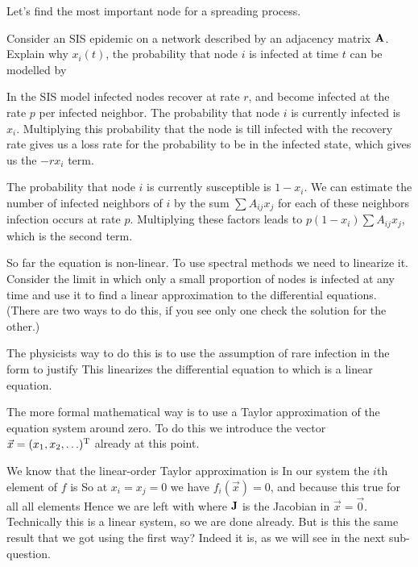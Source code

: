 

Let's find the most important node for a spreading process.

\subquestion Consider an SIS epidemic on a network described by an adjacency matrix $\bf A$. Explain why $x_i(t)$, the probability that node $i$ is infected at time $t$ can be modelled by 

\solution
In the SIS model infected nodes recover at rate $r$, and become infected at the rate $p$ per infected neighbor. The probability that node $i$ is currently infected is $x_i$. Multiplying this probability that the node is till infected with the recovery rate gives us a loss rate for the probability to be in the infected state, which gives us the $-rx_i$ term.

The probability that node $i$ is currently susceptible is $1-x_i$. We can estimate the number of infected neighbors of $i$ by the sum $\sum A_{ij} x_j$ for each of these neighbors infection occurs at rate $p$. Multiplying these factors leads to $p(1-x_i)\sum A_{ij}x_j$, which is the second term. 

\subquestion
So far the equation is non-linear. To use spectral methods we need to linearize it. Consider the limit in which only a small proportion of nodes is infected at any time and use it to find a linear approximation to the differential equations.
(There are two ways to do this, if you see only one check the solution for the other.)

\solution
The physicists way to do this is to use the assumption of rare infection in the form  
to justify
This linearizes the differential equation to
which is a linear equation. 

The more formal mathematical way is to use a Taylor approximation of the equation system around zero. To do this we introduce the vector $\vec{x}=(x_1,x_2,\ldots)^{\rm T}$ already at this point. 

We know that the linear-order Taylor approximation is
In our system the $i$th element of $f$ is
So at $x_i=x_j=0$ we have $f_i(\vec{x})=0$, and because this true for all 
all elements
Hence we are left with 
where $\bf J$ is the Jacobian in $\vec{x}=\vec{0}$. Technically this is a linear system, so we are done already. But is this the same result that we got using the first way? Indeed it is, as we will see in the next sub-question. 

